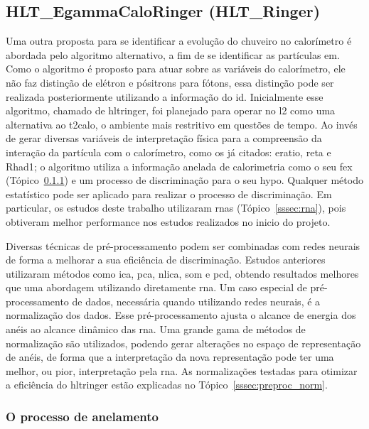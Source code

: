\subsection{HLT\_EgammaCaloRinger (HLT\_Ringer)}
\label{ssec:hlt_ringer}

Uma outra proposta para se identificar a evolução do chuveiro no calorímetro é 
abordada pelo algoritmo alternativo, a fim de se identificar as
partículas \gls{em}. Como o algoritmo é proposto para atuar sobre as variáveis
do calorímetro, ele não faz distinção de elétron e pósitrons para fótons, essa
distinção pode ser realizada posteriormente utilizando a informação do \gls{id}.
Inicialmente esse algoritmo, chamado de \gls{hltringer}, foi planejado para operar no
\acrlong{l2} como uma alternativa ao \gls{t2calo}, o ambiente mais restritivo 
em questões de tempo. Ao invés de gerar diversas variáveis de interpretação física 
para a compreensão da interação da partícula com o calorímetro, como os já
citados: \gls{eratio}, \gls{reta} e \gls{Rhad1}; o algoritmo utiliza a informação anelada
de calorimetria como o seu \gls{fex} (Tópico~\ref{sssec:anelamento}) 
e um processo de discriminação para o seu \gls{hypo}. Qualquer método estatístico 
pode ser aplicado para realizar o processo de discriminação. 
Em particular, os estudos deste trabalho utilizaram \glspl{rna} \cite{neural_networks} 
(Tópico~\ref{sssec:rna}), pois obtiveram melhor performance nos estudos
realizados no inicio do projeto.

Diversas técnicas de pré-processamento podem ser combinadas com redes neurais de
forma a melhorar a sua eficiência de discriminação. Estudos anteriores
\cite{tese_eduardo,tese_torres} utilizaram métodos como \gls{ica}, \gls{pca},
\gls{nlica}, \gls{som} e \gls{pcd}, obtendo resultados melhores que uma
abordagem utilizando diretamente \gls{rna}. Um caso especial de pré-processamento 
de dados, necessária quando utilizando redes neurais, é a normalização dos dados. Esse 
pré-processamento ajusta o alcance de energia dos anéis ao alcance dinâmico das
\gls{rna}. Uma grande gama de métodos de normalização são utilizados, podendo
gerar alterações no espaço de representação de anéis, de forma que a
interpretação da nova representação pode ter uma melhor, ou pior, interpretação
pela \gls{rna}. As normalizações testadas para otimizar a eficiência do
\gls{hltringer} estão explicadas no Tópico~\ref{sssec:preproc_norm}.

\subsubsection{O processo de anelamento}
\label{sssec:anelamento}

